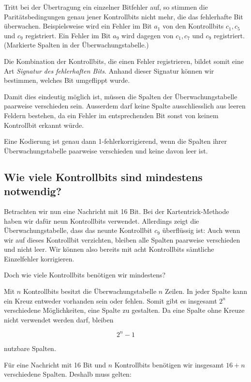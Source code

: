 Tritt bei der Übertragung ein einzelner Bitfehler auf, so stimmen
die Paritätsbedingungen genau jener Kontrollbits nicht mehr,
die das fehlerhafte Bit überwachen. Beispielsweise wird ein Fehler
im Bit \(a_1\) von den Kontrollbits \(c_1,c_5\) und \(c_9\)
registriert. Ein Fehler im Bit \(a_9\) wird dagegen von
\(c_1,c_7\) und \(c_9\) registriert. (Markierte Spalten in der Überwachungstabelle.)

Die Kombination der Kontrollbits, die einen Fehler registrieren,
bildet somit eine Art \emph{Signatur des fehlerhaften Bits}.
Anhand dieser Signatur können wir bestimmen, welches Bit
umgeflippt wurde.

Damit dies eindeutig möglich ist, müssen die Spalten der
Überwachungstabelle paarweise verschieden sein. Ausserdem darf
keine Spalte ausschliesslich aus leeren Feldern bestehen, da
ein Fehler im entsprechenden Bit sonst von keinem Kontrollbit
erkannt würde.
\begin{myremark}
    Eine Kodierung ist genau dann 1-fehlerkorrigierend,
    wenn die Spalten ihrer Überwachungstabelle paarweise verschieden
    und keine davon leer ist.
\end{myremark}



\subsection*{Wie viele Kontrollbits sind mindestens notwendig?}

Betrachten wir nun eine Nachricht mit 16 Bit. Bei der
Kartentrick-Methode haben wir dafür neun Kontrollbits verwendet.
Allerdings zeigt die Überwachungstabelle, dass das neunte
Kontrollbit \(c_9\) überflüssig ist: Auch wenn wir auf dieses
Kontrollbit verzichten, bleiben alle Spalten paarweise
verschieden und nicht leer. Wir können also bereits mit
acht Kontrollbits sämtliche Einzelfehler korrigieren.

Doch wie viele Kontrollbits benötigen wir mindestens?

Mit \(n\) Kontrollbits besitzt die Überwachungstabelle \(n\) Zeilen.
In jeder Spalte kann ein Kreuz entweder vorhanden sein oder
fehlen. Somit gibt es insgesamt \(2^n\) verschiedene Möglichkeiten,
eine Spalte zu gestalten. Da eine Spalte ohne Kreuze nicht
verwendet werden darf, bleiben

\[
    2^n-1
\]

nutzbare Spalten.

Für eine Nachricht mit 16 Bit und \(n\) Kontrollbits benötigen
wir insgesamt \(16+n\) verschiedene Spalten. Deshalb muss gelten:

